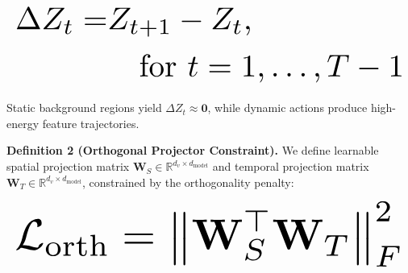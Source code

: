 \documentclass{article}
\begin{document}
\begin{equation}
\resizebox{\columnwidth}{!}{$\displaystyle
\begin{aligned}
\Delta Z_t = & Z_{t+1} - Z_t, \\
& \quad \text{for } t = 1, \ldots, T-1
\end{aligned}
$}
\end{equation}
























Static background regions yield $\Delta Z_t \approx \mathbf{0}$, while dynamic actions produce high-energy feature trajectories.

\textbf{Definition 2 (Orthogonal Projector Constraint).} We define learnable spatial projection matrix $\mathbf{W}_S \in \mathbb{R}^{d_v \times d_{\text{model}}}$ and temporal projection matrix $\mathbf{W}_T \in \mathbb{R}^{d_v \times d_{\text{model}}}$, constrained by the orthogonality penalty:
























\begin{equation}
\resizebox{\columnwidth}{!}{$\displaystyle
\begin{aligned}
\mathcal{L}_{\text{orth}} = \left\| \mathbf{W}_S^\top \mathbf{W}_T \right\|_F^2
\end{aligned}
$}
\end{equation}
\end{document}
